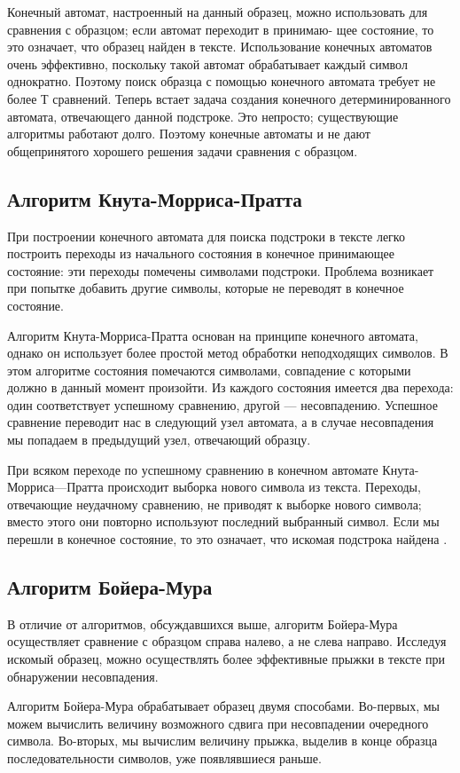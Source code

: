 \documentclass[a4paper, 14pt]{article}
\begin{document}
Конечный автомат, настроенный на данный образец, можно использовать для сравнения с образцом; если автомат переходит в принимаю-
щее состояние, то это означает, что образец найден в тексте. Использование конечных автоматов очень эффективно, поскольку такой автомат обрабатывает каждый символ однократно. Поэтому поиск образца с помощью конечного автомата требует не более Т сравнений. Теперь встает задача создания конечного детерминированного автомата, отвечающего данной подстроке. Это непросто; существующие алгоритмы работают долго. Поэтому конечные автоматы и не дают общепринятого хорошего решения задачи сравнения с образцом.
		\subsection{Алгоритм Кнута-Морриса-Пратта}
		При построении конечного автомата для поиска подстроки в тексте легко построить переходы из начального состояния в конечное принимающее состояние: эти переходы помечены символами подстроки. Проблема возникает при попытке добавить другие символы,
которые не переводят в конечное состояние.

	Алгоритм Кнута-Морриса-Пратта основан на принципе конечного автомата, однако он использует более простой метод обработки неподходящих символов. В этом алгоритме состояния помечаются символами, совпадение с которыми должно в данный момент произойти. Из каждого состояния имеется два перехода: один соответствует успешному сравнению, другой — несовпадению. Успешное сравнение переводит нас в следующий узел автомата, а в случае несовпадения мы попадаем в предыдущий узел, отвечающий образцу.
	
	При всяком переходе по успешному сравнению в конечном автомате Кнута-Морриса—Пратта происходит выборка нового символа из текста. Переходы, отвечающие неудачному сравнению, не приводят к выборке нового символа; вместо этого они повторно используют последний выбранный символ. Если мы перешли в конечное состояние, то это означает, что искомая подстрока найдена \cite{analg}.
		\subsection{Алгоритм Бойера-Мура}
		В отличие от алгоритмов, обсуждавшихся выше, алгоритм Бойера-Мура осуществляет сравнение с образцом справа налево, а не слева направо. Исследуя искомый образец, можно осуществлять более эффективные прыжки в тексте при обнаружении несовпадения.
		
		Алгоритм Бойера-Мура обрабатывает образец двумя способами. Во-первых, мы можем вычислить величину возможного сдвига при несовпадении очередного символа. Во-вторых, мы вычислим величину прыжка, выделив в конце образца последовательности символов, уже появлявшиеся раньше.
	
\end{document}
